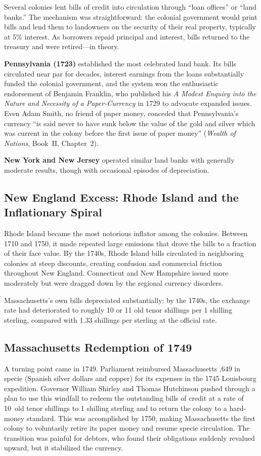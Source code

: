 \documentclass[12pt]{article}
\begin{document}
Several colonies lent bills of credit into circulation through ``loan offices''
or ``land banks.''  The mechanism was straightforward: the colonial government
would print bills and lend them to landowners on the security of their real
property, typically at 5\% interest.  As borrowers repaid principal and
interest, bills returned to the treasury and were retired---in theory.

\textbf{Pennsylvania (1723)} established the most celebrated land bank.  Its
bills circulated near par for decades, interest earnings from the loans
substantially funded the colonial government, and the system won the
enthusiastic endorsement of Benjamin Franklin, who published his \emph{A Modest
Enquiry into the Nature and Necessity of a Paper-Currency} in 1729 to advocate
expanded issues.  Even Adam Smith, no friend of paper money, conceded that
Pennsylvania's currency ``is said never to have sunk below the value of the
gold and silver which was current in the colony before the first issue of
paper money'' (\emph{Wealth of Nations}, Book~II, Chapter~2).

\textbf{New York and New Jersey} operated similar land banks with generally
moderate results, though with occasional episodes of depreciation.

\subsection{New England Excess: Rhode Island and the Inflationary Spiral}

Rhode Island became the most notorious inflator among the colonies.  Between
1710 and 1750, it made repeated large emissions that drove the bills to a
fraction of their face value.  By the 1740s, Rhode Island bills circulated in
neighboring colonies at steep discounts, creating confusion and commercial
friction throughout New England.  Connecticut and New Hampshire issued more
moderately but were dragged down by the regional currency disorders.

Massachusetts's own bills depreciated substantially: by the 1740s, the exchange
rate had deteriorated to roughly 10 or 11 old tenor shillings per 1 shilling
sterling, compared with 1.33 shillings per sterling at the official rate.

\subsection{Massachusetts Redemption of 1749}

A turning point came in 1749.  Parliament reimbursed Massachusetts
,649 in specie (Spanish silver dollars and copper) for its
expenses in the 1745 Louisbourg expedition.  Governor William Shirley and
Thomas Hutchinson pushed through a plan to use this windfall to redeem the
outstanding bills of credit at a rate of 10~old tenor shillings to 1 shilling
sterling and to return the colony to a hard-money standard.  This was
accomplished by 1750, making Massachusetts the first colony to voluntarily
retire its paper money and resume specie circulation.  The transition was
painful for debtors, who found their obligations suddenly revalued upward,
but it stabilized the currency.
\end{document}
